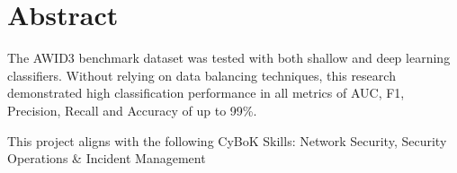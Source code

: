 
\section*{Abstract}
\vspace{2cm}




	
	
The AWID3 benchmark dataset was tested with both shallow and deep learning classifiers. Without relying on data balancing techniques, this research demonstrated high classification performance in all metrics of AUC, F1, Precision, Recall and Accuracy of up to 99\%. 

\begin{center}
	{\small This project aligns with the following CyBoK Skills: Network Security, Security Operations \& Incident Management }
	\vspace{10mm}
\end{center}